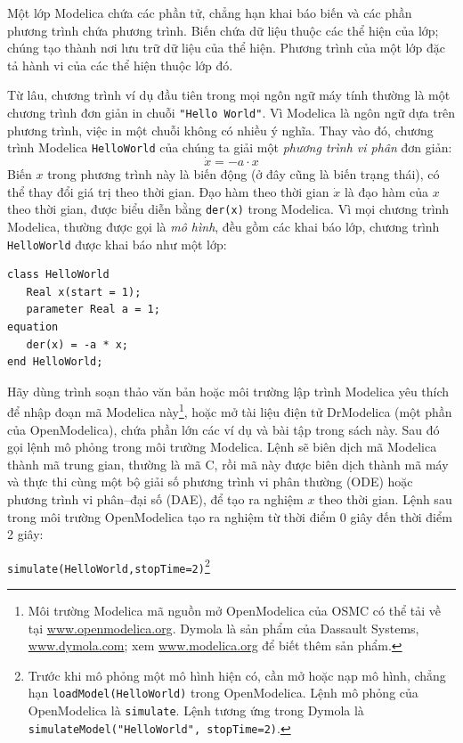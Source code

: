 Một lớp Modelica chứa các phần tử, chẳng hạn khai báo biến và các phần phương trình chứa phương trình. Biến chứa dữ liệu thuộc các thể hiện của lớp; chúng tạo thành nơi lưu trữ dữ liệu của thể hiện. Phương trình của một lớp đặc tả hành vi của các thể hiện thuộc lớp đó.

Từ lâu, chương trình ví dụ đầu tiên trong mọi ngôn ngữ máy tính thường là một chương trình đơn giản in chuỗi \texttt{"Hello World"}. Vì Modelica là ngôn ngữ dựa trên phương trình, việc in một chuỗi không có nhiều ý nghĩa. Thay vào đó, chương trình Modelica \texttt{HelloWorld} của chúng ta giải một \emph{phương trình vi phân} đơn giản:
\begin{equation}
\dot{x}=-a\cdot x \tag{3.1}
\end{equation}
Biến $x$ trong phương trình này là biến động (ở đây cũng là biến trạng thái), có thể thay đổi giá trị theo thời gian. Đạo hàm theo thời gian $\dot{x}$ là đạo hàm của $x$ theo thời gian, được biểu diễn bằng \texttt{der(x)} trong Modelica. Vì mọi chương trình Modelica, thường được gọi là \emph{mô hình}, đều gồm các khai báo lớp, chương trình \texttt{HelloWorld} được khai báo như một lớp:
\begin{verbatim}
class HelloWorld
   Real x(start = 1);
   parameter Real a = 1;
equation
   der(x) = -a * x;
end HelloWorld;
\end{verbatim}
Hãy dùng trình soạn thảo văn bản hoặc môi trường lập trình Modelica yêu thích để nhập đoạn mã Modelica này\footnote{Môi trường Modelica mã nguồn mở OpenModelica của OSMC có thể tải về tại \url{www.openmodelica.org}. Dymola là sản phẩm của Dassault Systems, \url{www.dymola.com}; xem \url{www.modelica.org} để biết thêm sản phẩm.}, hoặc mở tài liệu điện tử DrModelica (một phần của OpenModelica), chứa phần lớn các ví dụ và bài tập trong sách này. Sau đó gọi lệnh mô phỏng trong môi trường Modelica. Lệnh sẽ biên dịch mã Modelica thành mã trung gian, thường là mã C, rồi mã này được biên dịch thành mã máy và thực thi cùng một bộ giải số phương trình vi phân thường (ODE) hoặc phương trình vi phân--đại số (DAE), để tạo ra nghiệm $x$ theo thời gian. Lệnh sau trong môi trường OpenModelica tạo ra nghiệm từ thời điểm 0 giây đến thời điểm 2 giây:

\noindent\texttt{simulate(HelloWorld,stopTime=2)}\footnote{Trước khi mô phỏng một mô hình hiện có, cần mở hoặc nạp mô hình, chẳng hạn \texttt{loadModel(HelloWorld)} trong OpenModelica. Lệnh mô phỏng của OpenModelica là \texttt{simulate}. Lệnh tương ứng trong Dymola là \texttt{simulateModel("HelloWorld", stopTime=2)}.}

